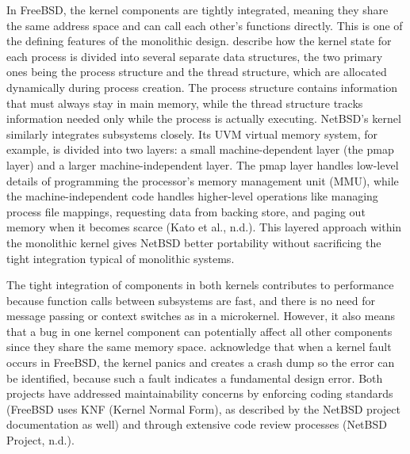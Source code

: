 In FreeBSD, the kernel components are tightly integrated, meaning they share the same address space and can call each other's functions directly. This is one of the defining features of the monolithic design. \textcite{watson2015} describe how the kernel state for each process is divided into several separate data structures, the two primary ones being the process structure and the thread structure, which are allocated dynamically during process creation. The process structure contains information that must always stay in main memory, while the thread structure tracks information needed only while the process is actually executing.
NetBSD's kernel similarly integrates subsystems closely. Its UVM virtual memory system, for example, is divided into two layers: a small machine-dependent layer (the pmap layer) and a larger machine-independent layer. The pmap layer handles low-level details of programming the processor's memory management unit (MMU), while the machine-independent code handles higher-level operations like managing process file mappings, requesting data from backing store, and paging out memory when it becomes scarce (Kato et al., n.d.). This layered approach within the monolithic kernel gives NetBSD better portability without sacrificing the tight integration typical of monolithic systems.

The tight integration of components in both kernels contributes to performance because function calls between subsystems are fast, and there is no need for message passing or context switches as in a microkernel. However, it also means that a bug in one kernel component can potentially affect all other components since they share the same memory space. \textcite{watson2015} acknowledge that when a kernel fault occurs in FreeBSD, the kernel panics and creates a crash dump so the error can be identified, because such a fault indicates a fundamental design error. Both projects have addressed maintainability concerns by enforcing coding standards (FreeBSD uses KNF (Kernel Normal Form), as described by the NetBSD project documentation as well) and through extensive code review processes (NetBSD Project, n.d.).

